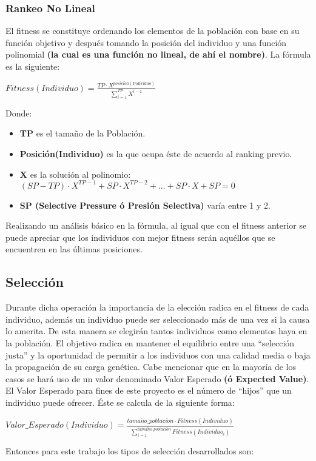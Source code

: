 \documentclass[class=report, crop=false]{standalone}
\begin{document}
\subsubsection{Rankeo No Lineal}
El fitness se constituye ordenando los elementos de la 
población con base en su función objetivo y después 
tomando la posición del individuo y una función 
polinomial \textbf{(la cual es una función no lineal, de ahí el nombre)}. 
La fórmula es la siguiente:\medskip\break
\centerline{$Fitness(Individuo) = \frac{TP \cdot X^{posici\acute{o}n(Individuo)}}{\sum_{i=1}^{TP}X^{i - 1}}$}\medskip\break
Donde:

\begin{itemize}
\item \textbf{TP} es el tamaño de la Población.
\item \textbf{Posición(Individuo)} es la que ocupa éste de acuerdo al ranking previo.
\item \textbf{X} es la solución al polinomio: \((SP - TP) \cdot X^{TP - 1} + SP \cdot X^{TP - 2} + ... + SP \cdot X + SP = 0\)
\item \textbf{SP (Selective Pressure ó Presión Selectiva)} varía entre 1 y 2.
\end{itemize}

Realizando un análisis básico en la fórmula, al igual que 
con el fitness anterior se puede apreciar que los individuos 
con mejor fitness serán aquéllos que se encuentren en las 
últimas posiciones.

\subsection{Selección}
\label{sec:c2_4}
Durante dicha operación la importancia de la elección radica 
en el fitness de cada individuo, además un individuo puede ser 
seleccionado más de una vez si la causa lo amerita.\break
De esta manera se elegirán tantos individuos como elementos haya 
en la población.\medskip\break
El objetivo radica en mantener el equilibrio entre una ``selección 
justa'' y la oportunidad de permitir a los individuos con una 
calidad media o baja la propagación de su carga genética.\medskip\break
Cabe mencionar que en la mayoría de los casos se hará uso de un
valor denominado Valor Esperado \textbf{(ó Expected Value)}. 
El Valor Esperado para fines de este proyecto es el número de 
``hijos'' que un individuo puede ofrecer. Éste se calcula de 
la siguiente forma:\medskip\break
\centerline{$Valor\_Esperado(Individuo) = \frac{tama\tilde{n}o\_poblaci\acute{o}n \cdot Fitness(Individuo)}{\sum_{i=1}^{tama\tilde{n}o\_poblaci\acute{o}n}Fitness(Individuo_i)}$}\medskip\break
Entonces para este trabajo los tipos de selección desarrollados 
son:
\end{document}
